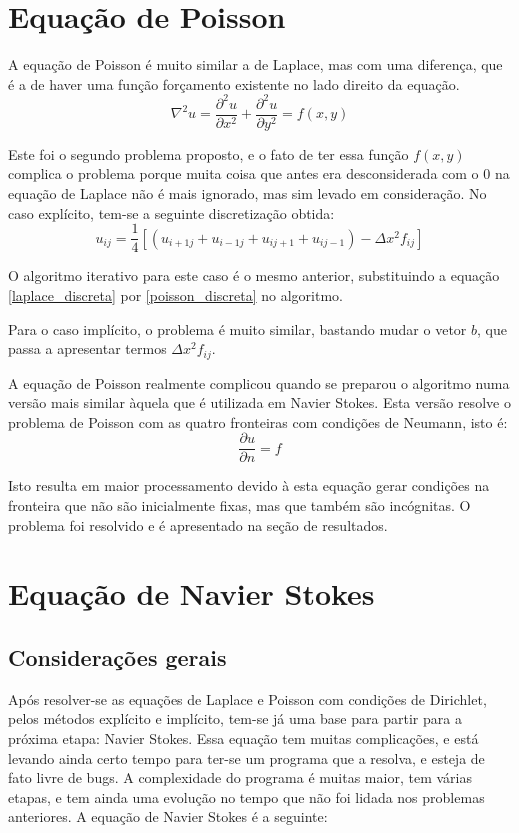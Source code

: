 \documentclass[journal]{IEEEtran}
\begin{document}
\section{Equação de Poisson}

A equação de Poisson é muito similar a de Laplace, mas com uma diferença, que é a de haver uma função forçamento existente no lado direito da equação.
\begin{equation}
  \nabla^2 u=\frac{\partial^2 u}{\partial x^2}+\frac{\partial^2 u}{\partial y^2}=f(x,y)\label{poisson}
\end{equation}

Este foi o segundo problema proposto, e o fato de ter essa função $f(x,y)$ complica o problema porque muita coisa que antes era desconsiderada com o $0$ na equação de Laplace não é mais ignorado, mas sim levado em consideração. No caso explícito, tem-se a seguinte discretização obtida:
\begin{equation}
u_{ij}=\frac{1}{4}[(u_{i+1j}+u_{i-1j}+u_{ij+1}+u_{ij-1})-\Delta x^2 f_{ij}] \label{poisson_discreta}
\end{equation}

O algoritmo iterativo para este caso é o mesmo anterior, substituindo a equação \ref{laplace_discreta} por \ref{poisson_discreta} no algoritmo.

Para o caso implícito, o problema é muito similar, bastando mudar o vetor $b$, que passa a apresentar termos $\Delta x^2 f_{ij}$.

A equação de Poisson realmente complicou quando se preparou o algoritmo numa versão mais similar àquela que é utilizada em Navier Stokes. Esta versão resolve o problema de Poisson com as quatro fronteiras com condições de Neumann, isto é:
\begin{equation}
\frac{\partial u}{\partial n} = f
\end{equation}

Isto resulta em maior processamento devido à esta equação gerar condições na fronteira que não são inicialmente fixas, mas que também são incógnitas. O problema foi resolvido e é apresentado na seção de resultados.
\section{Equação de Navier Stokes}
\subsection*{Considerações gerais}
Após resolver-se as equações de Laplace e Poisson com condições de Dirichlet, pelos métodos explícito e implícito, tem-se já uma base para partir para a próxima etapa: Navier Stokes. Essa equação tem muitas complicações, e está levando ainda certo tempo para ter-se um programa que a resolva, e esteja de fato livre de bugs. A complexidade do programa é muitas maior, tem várias etapas, e tem ainda uma evolução no tempo que não foi lidada nos problemas anteriores. A equação de Navier Stokes é a seguinte:
\end{document}

